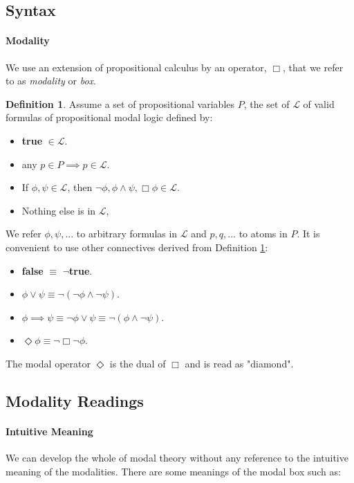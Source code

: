 \documentclass{article}
\theoremstyle{plain}
\theoremstyle{definition}
\newtheorem{defn}[thm]{Definition} %
\begin{document}
\begin{multicols}{2}
\subsection{Syntax}

\paragraph{Modality} We use an extension of propositional calculus by an operator, $\Box$, that we refer to as \textit{modality} or \textit{box}.

\begin{defn}\label{defn:Syntax} Assume a set of propositional variables $P$, the set of $\mathcal{L}$ of valid formulas of propositional modal logic defined by: \end{defn}

\begin{itemize}
\item \textbf{true} $\in \mathcal{L}$.
\item any $p \in P \implies p \in \mathcal{L}$.
\item If $\phi, \psi \in \mathcal{L}$, then $\lnot \phi, \phi \land \psi, \Box \phi \in \mathcal{L}$.
\item Nothing else is in $\mathcal{L}$,
\end{itemize}

We refer $\phi, \psi,...$ to arbitrary formulas in $\mathcal{L}$ and $p, q, ...$ to atoms in $P$. It is convenient to use other connectives derived from Definition \ref{defn:Syntax}:

\begin{itemize}
\item \textbf{false} $\equiv$ $\lnot$\textbf{true}.
\item $\phi \lor \psi \equiv \lnot(\lnot\phi \land \lnot\psi)$.
\item $\phi \implies \psi \equiv \lnot\phi\lor\psi \equiv \lnot(\phi \land \lnot\psi)$.
\item $\Diamond\phi \equiv \lnot\Box\lnot\phi$.
\end{itemize}

\noindent The modal operator $\Diamond$ is the dual of $\Box$ and is read as "diamond".

\subsection{Modality Readings}

\paragraph{Intuitive Meaning} We can develop the whole of modal theory without any reference to the intuitive meaning of the modalities. There are some meanings of the modal box such as:


\end{multicols}
\end{document}
